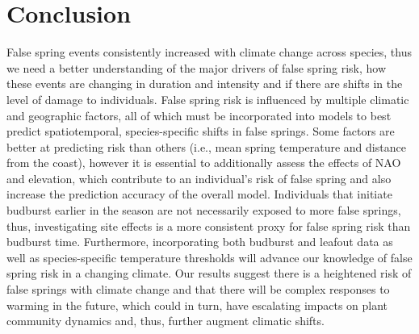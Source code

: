 \documentclass{article}\usepackage[]{graphicx}\usepackage[]{color}
\begin{document}
\section*{Conclusion}
False spring events consistently increased with climate change across species, thus we need a better understanding of the major drivers of false spring risk, how these events are changing in duration and intensity and if there are shifts in the level of damage to individuals. False spring risk is influenced by multiple climatic and geographic factors, all of which must be incorporated into models to best predict spatiotemporal, species-specific shifts in false springs. Some factors are better at predicting risk than others (i.e., mean spring temperature and distance from the coast), however it is essential to additionally assess the effects of NAO and elevation, which contribute to an individual's risk of false spring and also increase the prediction accuracy of the overall model. Individuals that initiate budburst earlier in the season are not necessarily exposed to more false springs, thus, investigating site effects is a more consistent proxy for false spring risk than budburst time. %
Furthermore, incorporating both budburst and leafout data as well as species-specific temperature thresholds will advance our knowledge of false spring risk in a changing climate. Our results suggest there is a heightened risk of false springs with climate change and that there will be complex responses to warming in the future, which could in turn, have escalating impacts on plant community dynamics and, thus, further augment climatic shifts.  
\end{document}
